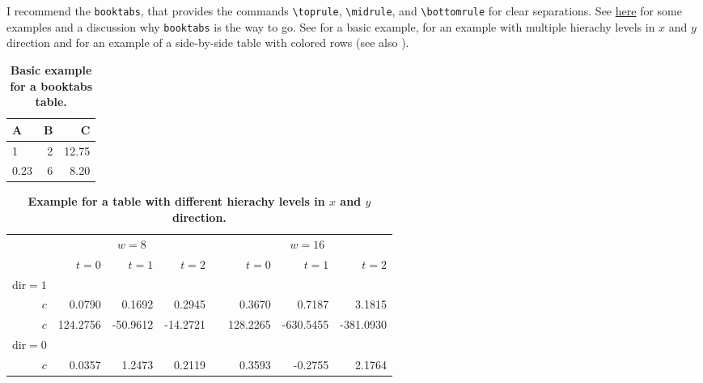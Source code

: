 I recommend the \verb|booktabs|, that provides the commands \verb|\toprule|, \verb|\midrule|, and \verb|\bottomrule| for clear separations. See \href{https://nhigham.com/2019/11/19/better-latex-tables-with-booktabs/}{here} for some examples and a discussion why \verb|booktabs| is the way to go. See  for a basic example,  for an example with multiple hierachy levels in $x$ and $y$ direction and  for an example of a side-by-side table with colored rows (see also ).

\begin{table}
\centering 
\caption{\textbf{Basic example for a booktabs table.}}
\label{tab:table1}
\vspace{5ex}
	\begin{tabular}{lrr} 
		\toprule
		A & B & C \\ 
		\midrule 
		1 & 2 & 12.75 \\
		0.23 & 6 & 8.20 \\
		\bottomrule
	\end{tabular}
\end{table}

\begin{table}
	\centering
	\caption{\textbf{Example for a table with different hierachy levels in $x$ and $y$ direction.}}
	\label{tab:table2}
	\vspace{5ex}
	\begin{tabular}{@{}rrrrcrrr@{}}\toprule
		& \multicolumn{3}{c}{$w = 8$} & \phantom{abc}& \multicolumn{3}{c}{$w = 16$} \\
		\cmidrule{2-4} \cmidrule{6-8}
		& $t=0$ & $t=1$ & $t=2$ && $t=0$ & $t=1$ & $t=2$\\ 
		\midrule
		$\mathrm{dir}=1$\\
		$c$ & 0.0790 & 0.1692 & 0.2945 && 0.3670 & 0.7187 & 3.1815 \\
		$c$ & 124.2756& -50.9612& -14.2721&& 128.2265& -630.5455& -381.0930\\
		$\mathrm{dir}=0$\\
		$c$ & 0.0357& 1.2473& 0.2119&& 0.3593& -0.2755& 2.1764\\
		\bottomrule
	\end{tabular}

\end{table}


